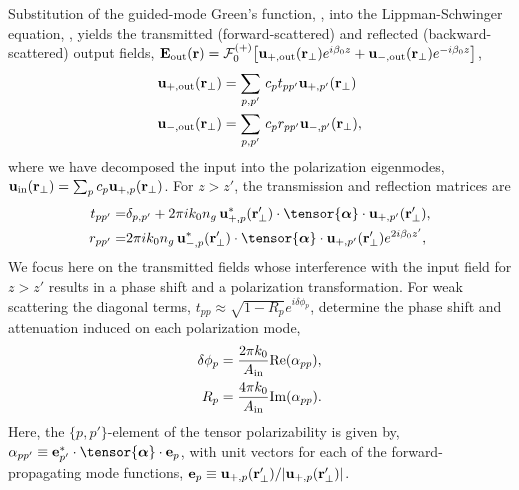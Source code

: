 \documentclass[preprint, aps,pra,onecolumn]{revtex4-1} %
\newcommand{\out}{{\rm out}}
\newcommand{\fwd}{+}
\newcommand{\bwd}{-}
\newcommand{\trans}{+}
\newcommand{\refl}{-}
\newcommand{\Eamp}{\mathcal{F}_0^{(+)}}
\begin{document}
Substitution of the guided-mode Green's function, , into the Lippman-Schwinger equation, , yields the transmitted (forward-scattered) and reflected (backward-scattered) output fields, $\mathbf{E}_{\out}(\br) = \Eamp \big[ \mathbf{u}_{\trans, \out} (\br_\perp) e^{i \beta_0 z} + \mathbf{u}_{\refl,\out} (\br_\perp) e^{-i \beta_0 z} \big]$, 
\begin{subequations}
	\begin{align}
		\mathbf{u}_{\trans, \out} (\br_\perp) &=  \sum_{p,p'}  \, c_{p} t_{pp'} \mathbf{u}_{\fwd, p'}(\br_\perp) \\ 
		\mathbf{u}_{\refl,\out} (\br_\perp) &=  \sum_{p,p'}  \, c_{p} r_{pp'} \mathbf{u}_{\bwd, p'}(\br_\perp),
	\end{align}
\end{subequations}
where we have decomposed the input into the polarization eigenmodes, $\mbf{u}_{\rm in}(\mbf{r}_\perp) = \sum_{p} c_{p} \mathbf{u}_{\fwd,p}(\br_\perp)$.  
For $z>z'$, the transmission and reflection matrices are 
\begin{subequations}
	\begin{align} \label{Eq::PolarizationTransformation}
		t_{pp'} =& \delta_{p,p'} +  2\pi i k_0 n_g \, \mathbf{u}^*_{+, p}(\br'_\perp) \cdot 
\tensor{\boldsymbol{\alpha}} \cdot \mathbf{u}_{+, p'}(\br'_\perp) , \\
		r_{pp'} =&  2\pi i k_0 n_g \, \mathbf{u}^*_{\bwd, p}(\br'_\perp) \cdot 
\tensor{\boldsymbol{\alpha}} \cdot \mathbf{u}_{\fwd, p'}(\br'_\perp) e^{2 i\beta_0 z'} , 
	\end{align} 
\end{subequations}
We focus here on the transmitted fields whose interference with the input field for $z>z'$ results in a phase shift and a polarization transformation.  
For weak scattering the diagonal terms, $t_{p p} \approx \sqrt{1-R_p}e^{i \delta \phi_p}$, determine the phase shift and attenuation induced on each polarization mode,
\begin{subequations}
	\begin{align}
		 \delta \phi_p &= \frac{2 \pi k_0}{A_{\rm in}} {\rm Re}(\alpha_{pp}),  \label{Eq::PhaseShift} \\
		R_p &=  \frac{4 \pi k_0}{A_{\rm in}} {\rm Im}(\alpha_{pp}) .\label{Eq::Attenuation} 
	\end{align} 
\end{subequations}
Here, the $\{p,p'\}$-element of the tensor polarizability is given by, $\alpha_{pp'} \equiv \mathbf{e}^*_{p'} \cdot \tensor{\boldsymbol{\alpha}}\cdot \mathbf{e}_{p}$, with unit vectors for each of the forward-propagating mode functions, $\mathbf{e}_{p}\equiv \mathbf{u}_{+,p}(\mathbf{r}'_\perp)/|\mathbf{u}_{+,p}(\mathbf{r}'_\perp)|$. 
\end{document}
